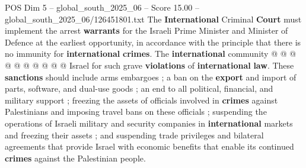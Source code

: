 \begin{textsample}{POS Dim 5 – global\_south\_2025\_06 – Score 15.00 – global\_south\_2025\_06/126451801.txt}
The \textbf{International} Criminal \textbf{Court} must implement the arrest \textbf{warrants} for the Israeli Prime Minister and Minister of Defence at the earliest opportunity, in accordance with the principle that there is no immunity for \textbf{international} \textbf{crimes}.
The \textbf{international} community @ @ @ @ @ @ @ @ @ @ Israel for such grave \textbf{violations} of \textbf{international} \textbf{law}.
These \textbf{sanctions} should include arms embargoes ; a ban on the \textbf{export} and import of parts, software, and dual-use goods ; an end to all political, financial, and military support ; freezing the assets of officials involved in \textbf{crimes} against Palestinians and imposing travel bans on these officials ; suspending the operations of Israeli military and security companies in \textbf{international} markets and freezing their assets ; and suspending trade privileges and bilateral agreements that provide Israel with economic benefits that enable its continued \textbf{crimes} against the Palestinian people.

\end{textsample}
